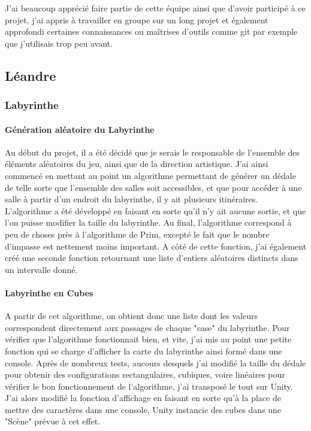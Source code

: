 \documentclass{article}
\begin{document}
J'ai beaucoup apprécié faire partie de cette équipe ainsi que d'avoir participé à ce projet, j'ai appris à travailler en groupe sur un long projet et également approfondi certaines connaissances ou maîtrises d'outils comme git par exemple que j'utilisais trop peu avant.

\subsection{Léandre}
\newpage
\subsubsection{Labyrinthe}

\paragraph{Génération aléatoire du Labyrinthe}
Au début du projet, il a été décidé que je serais le responsable de l'ensemble des éléments aléatoires du jeu, ainsi que de la direction artistique. J'ai ainsi commencé en mettant au point un algorithme permettant de générer un dédale de telle sorte que l'ensemble des salles soit accessibles, et que pour accéder à une salle à partir d'un endroit du labyrinthe, il y ait plusieurs itinéraires. L'algorithme a été développé en faisant en sorte qu'il n'y ait aucune sortie, et que l'on puisse modifier la taille du labyrinthe. Au final, l'algorithme correspond à peu de choses près à l'algorithme de Prim, excepté le fait que le nombre d'impasse est nettement moins important. A côté de cette fonction, j'ai également créé une seconde fonction retournant une liste d'entiers aléatoires distincts dans un intervalle donné.

\paragraph{Labyrinthe en Cubes}
A partir de cet algorithme, on obtient donc une liste dont les valeurs correspondent directement aux passages de chaque "case" du labyrinthe. Pour vérifier que l'algorithme fonctionnait bien, et vite, j'ai mis au point une petite fonction qui se charge d'afficher la carte du labyrinthe ainsi formé dans une console. Après de nombreux tests, aucours desquels j'ai modifié la taille du dédale pour obtenir des configurations rectangulaires, cubiques, voire linéaires pour vérifier le bon fonctionnement de l'algorithme, j'ai transposé le tout sur Unity. J'ai alors modifié la fonction d'affichage en faisant en sorte qu'à la place de mettre des caractères dans une console, Unity instancie des cubes dans une "Scène" prévue à cet effet.
\end{document}
